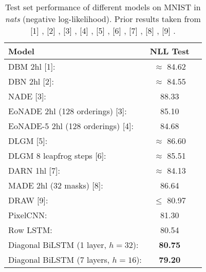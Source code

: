 \documentclass{article}
\begin{document}
\begin{table}[!h]
	\begin{center}
	\begin{tabular}{lcc}
		\toprule
		\textbf{Model} & \textbf{NLL Test}  \\ 
		\midrule
		DBM 2hl [1]: & $\approx$ 84.62 \\ 
		DBN 2hl [2]: & $\approx$ 84.55 \\ 
		NADE [3]: & 88.33 \\ 
		EoNADE 2hl (128 orderings) [3]: & 85.10 \\ 
		EoNADE-5 2hl (128 orderings) [4]: \quad \quad \quad & 84.68 \\ 
		DLGM [5]: & $\approx$ 86.60 \\ 
		DLGM 8 leapfrog steps [6]: & $\approx$ 85.51 \\ 
		DARN 1hl [7]: & $\approx$ 84.13 \\ 
		MADE 2hl (32 masks) [8]: & 86.64 \\
		DRAW [9]: & $\leq$ 80.97 \\ 
		\midrule
		PixelCNN: & 81.30 \\ 
		Row LSTM: & 80.54 \\ 
		Diagonal BiLSTM (1 layer, $h=32$): & \textbf{80.75} \\
		Diagonal BiLSTM (7 layers, $h=16$): & \textbf{79.20} \\ 
	    \bottomrule
	\end{tabular}
	\end{center}
\vspace{-0.2cm}
\caption{Test set performance of different models on MNIST in \emph{nats} (negative log-likelihood). Prior results taken from [1] \cite{salakhutdinov2009deep}, [2] \cite{murray2009evaluating}, [3] \cite{uria2013deep}, [4] \cite{raiko2014iterative}, [5] \cite{rezende2014stochastic}, [6] \cite{salimans2014markov}, [7] \cite{gregor2013deep}, [8] \cite{germain2015made}, [9] \cite{gregor2015draw}.}
\label{table:mnist}
\end{table}
\end{document}
